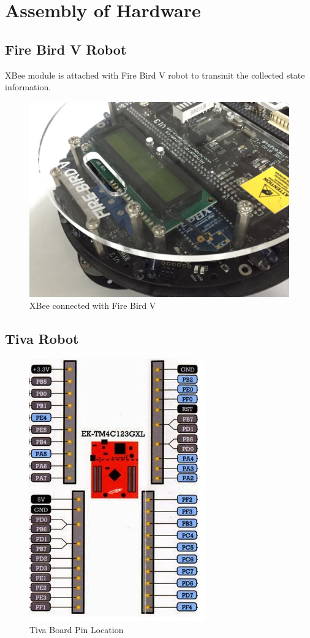 \documentclass[a4paper,12pt,oneside]{book}
\begin{document}
\section{Assembly of Hardware}
\subsection{Fire Bird V Robot}
XBee module is attached with Fire Bird V robot to transmit the collected state information.
\begin{figure}[h]
        \centering
        \includegraphics[scale=0.19]{XBee_connected}
        \caption{XBee connected with Fire Bird V}
      \end{figure}
\subsection{Tiva Robot}

   \begin{figure}[h]
        \centering
        \includegraphics[scale=0.56]{tiva_pin}
        \caption{Tiva Board Pin Location}
      \end{figure}
\end{document}
